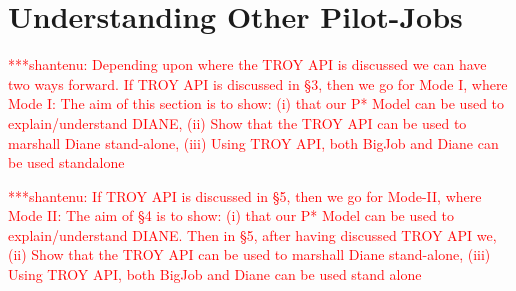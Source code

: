 \documentclass[conference,final]{IEEEtran}
\newcommand{\jhanote}[1]{ {\textcolor{red} { ***shantenu: #1 }}}
\newcommand{\jhanote}[1]{}
\newcommand{\upp}{\vspace*{-0.5em}}
\begin{document}
% 
% 


\section{Understanding Other Pilot-Jobs\upp\upp}


\jhanote{Depending upon where the TROY API is discussed we can have
  two ways forward. If TROY API is discussed in \S3, then we go for
  Mode I, where Mode I: The aim of this section is to show: (i) that
  our P* Model can be used to explain/understand DIANE, (ii) Show that
  the TROY API can be used to marshall Diane stand-alone, (iii) Using
  TROY API, both BigJob and Diane can be used standalone}

\jhanote{If TROY API is discussed in \S5, then we go for Mode-II,
  where Mode II: The aim of \S4 is to show: (i) that our P* Model can
  be used to explain/understand DIANE.  Then in \S5, after having
  discussed TROY API we, (ii) Show that the TROY API can be used to
  marshall Diane stand-alone, (iii) Using TROY API, both BigJob and
  Diane can be used stand alone}
\end{document}
